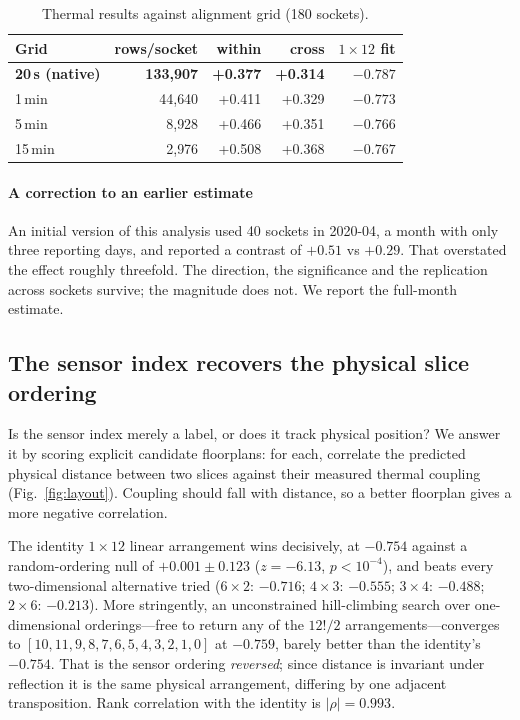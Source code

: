 \documentclass[10pt,conference]{IEEEtran}
\begin{document}
\begin{table}[h]\centering\caption{Thermal results against alignment grid (180 sockets).}
\label{tab:grid}\footnotesize
\begin{tabular}{lrrrr}\toprule
Grid & rows/socket & within & cross & $1\times12$ fit\\\midrule
\textbf{20\,s (native)} & \textbf{133{,}907} & \textbf{+0.377} & \textbf{+0.314} & \textbf{$-0.787$}\\
1\,min & 44{,}640 & +0.411 & +0.329 & $-0.773$\\
5\,min & 8{,}928 & +0.466 & +0.351 & $-0.766$\\
15\,min & 2{,}976 & +0.508 & +0.368 & $-0.767$\\
\bottomrule\end{tabular}\end{table}

\paragraph*{A correction to an earlier estimate} An initial version of this analysis used 40
sockets in 2020-04, a month with only three reporting days, and reported a contrast of
$+0.51$ vs $+0.29$. That overstated the effect roughly threefold. The direction, the significance
and the replication across sockets survive; the magnitude does not. We report the full-month
estimate.

\subsection{The sensor index recovers the physical slice ordering}
\label{sec:layout}
Is the sensor index merely a label, or does it track physical position? We answer it by scoring
explicit candidate floorplans: for each, correlate the predicted physical distance between two
slices against their measured thermal coupling (Fig.~\ref{fig:layout}). Coupling should fall with
distance, so a better floorplan gives a more negative correlation.

The identity $1\times12$ linear arrangement wins decisively, at $-0.754$ against a
random-ordering null of $+0.001\pm0.123$ ($z=-6.13$, $p<10^{-4}$), and beats every two-dimensional
alternative tried ($6\times2$: $-0.716$; $4\times3$: $-0.555$; $3\times4$: $-0.488$; $2\times6$:
$-0.213$). More stringently, an unconstrained hill-climbing search over one-dimensional
orderings---free to return any of the $12!/2$ arrangements---converges to
$[10,11,9,8,7,6,5,4,3,2,1,0]$ at $-0.759$, barely better than the identity's $-0.754$. That is the
sensor ordering \emph{reversed}; since distance is invariant under reflection it is the same
physical arrangement, differing by one adjacent transposition. Rank correlation with the identity
is $|\rho|=0.993$.
\end{document}
